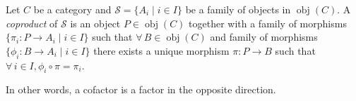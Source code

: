 \documentclass[letterpaper,12pt,fleqn]{article}
\DeclareMathOperator{\obj}{obj}
\begin{document}
\begin{definition}[Coproduct]
  Let $C$ be a category and $\mathcal{S}=\{A_i\mid i\in I\}$ be a family of
  objects in $\obj(C)$. A \emph{coproduct} of $\mathcal{S}$ is an object
  $P\in\obj(C)$ together with a family of morphisms
  $\{\pi_i:P\to A_i\mid i\in I\}$ such that $\forall\,B\in\obj(C)$
  and family of morphisms $\{\phi_i:B\to A_i\mid i\in I\}$ there exists a
  unique morphism $\pi:P\to B$ such that
  $\forall\,i\in I,\phi_i\circ\pi=\pi_i$.
\end{definition}

In other words, a cofactor is a factor in the opposite direction.
\end{document}
